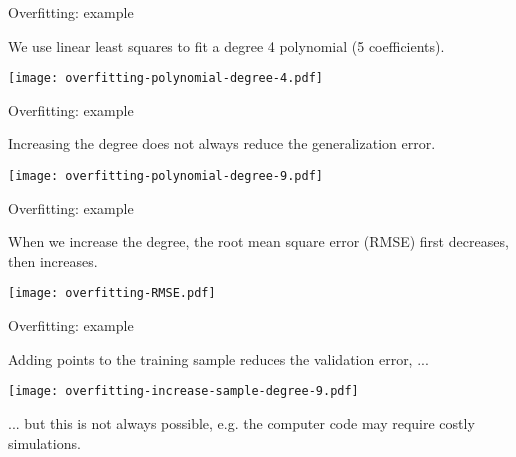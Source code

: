 \documentclass{beamer}
\begin{document}

\begin{frame}[t]{Overfitting: example}

We use linear least squares to fit a degree 4 polynomial (5 coefficients).

\begin{center}
 \texttt{[image: overfitting-polynomial-degree-4.pdf]}
\end{center}

\end{frame}


\begin{frame}[t]{Overfitting: example}

Increasing the degree does not always reduce the generalization error. 

\begin{center}
 \texttt{[image: overfitting-polynomial-degree-9.pdf]}
\end{center}

\end{frame}


\begin{frame}[t]{Overfitting: example}

When we increase the degree, the root mean square error (RMSE) 
first decreases, then increases. 

\begin{center}
 \texttt{[image: overfitting-RMSE.pdf]}
\end{center}

\end{frame}


\begin{frame}[t]{Overfitting: example}

Adding points to the training sample reduces the validation error, ...

\begin{center}
 \texttt{[image: overfitting-increase-sample-degree-9.pdf]}
\end{center}

... but this is not always possible, e.g. the computer code may require 
costly simulations. 

\end{frame}
\end{document}
